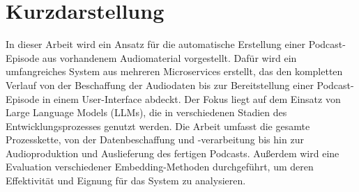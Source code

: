 \thispagestyle{empty}
\section*{Kurzdarstellung}\label{sec:kurzdarstellung}

In dieser Arbeit wird ein Ansatz für die automatische Erstellung einer Podcast-Episode aus vorhandenem Audiomaterial vorgestellt. 
Dafür wird ein umfangreiches System aus mehreren Microservices erstellt, das den kompletten Verlauf von der Beschaffung der Audiodaten bis zur Bereitstellung einer Podcast-Episode in einem User-Interface abdeckt.
Der Fokus liegt auf dem Einsatz von Large Language Models (LLMs), die in verschiedenen Stadien des Entwicklungsprozesses genutzt werden. 
Die Arbeit umfasst die gesamte Prozesskette, von der Datenbeschaffung und -verarbeitung bis hin zur Audioproduktion und Auslieferung des fertigen Podcasts. 
Außerdem wird eine Evaluation verschiedener Embedding-Methoden durchgeführt, um deren Effektivität und Eignung für das System zu analysieren.
